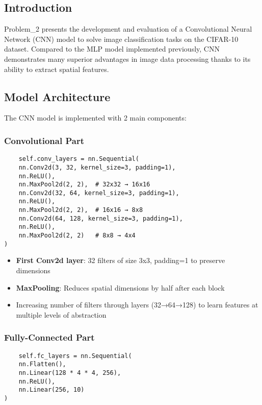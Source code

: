 \documentclass[12pt]{article}
\begin{document}
\subsection{Introduction}

Problem\_2 presents the development and evaluation of a Convolutional Neural Network 
(CNN) model to solve image classification tasks on the CIFAR-10 dataset. Compared to 
the MLP model implemented previously, CNN demonstrates many superior advantages in 
image data processing thanks to its ability to extract spatial features.

\subsection{Model Architecture}

The CNN model is implemented with 2 main components:

\subsubsection{Convolutional Part}

\begin{verbatim}
    self.conv_layers = nn.Sequential(
    nn.Conv2d(3, 32, kernel_size=3, padding=1),
    nn.ReLU(),
    nn.MaxPool2d(2, 2),  # 32x32 → 16x16
    nn.Conv2d(32, 64, kernel_size=3, padding=1),
    nn.ReLU(),
    nn.MaxPool2d(2, 2),  # 16x16 → 8x8
    nn.Conv2d(64, 128, kernel_size=3, padding=1),
    nn.ReLU(),
    nn.MaxPool2d(2, 2)   # 8x8 → 4x4
)
\end{verbatim}

\begin{itemize}
    \item \textbf{First Conv2d layer}: 32 filters of size 3x3, padding=1 to preserve dimensions
    \item \textbf{MaxPooling}: Reduces spatial dimensions by half after each block
    \item Increasing number of filters through layers (32→64→128) to learn features 
    at multiple levels of abstraction
\end{itemize}

\subsubsection{Fully-Connected Part}

\begin{verbatim}
    self.fc_layers = nn.Sequential(
    nn.Flatten(),
    nn.Linear(128 * 4 * 4, 256),
    nn.ReLU(),
    nn.Linear(256, 10)
)
\end{verbatim}
\end{document}
